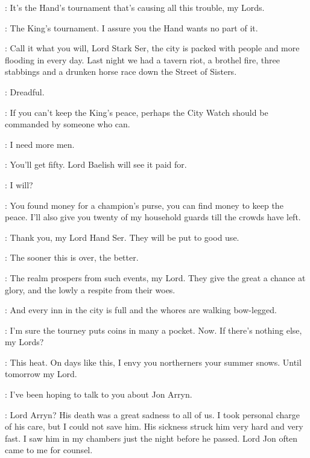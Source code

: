 
\JANOSSLYNT: It's the Hand's tournament that's causing all this trouble, my Lords. 

\NED: The King's tournament. I assure you the Hand wants no part of it. 

\JANOSSLYNT: Call it what you will, Lord Stark Ser, the city is packed with people and more flooding in every day. Last night we had a tavern riot, a brothel fire, three stabbings and a drunken horse race down the Street of Sisters. 

\VARYS: Dreadful. 

\RENLY: If you can't keep the King's peace, perhaps the City Watch should be commanded by someone who can. 

\JANOSSLYNT: I need more men. 

\NED: You'll get fifty. Lord Baelish will see it paid for. 

\LITTLEFINGER: I will? 

\NED: You found money for a champion's purse, you can find money to keep the peace. I'll also give you twenty of my household guards till the crowds have left. 

\JANOSSLYNT: Thank you, my Lord Hand Ser. They will be put to good use. 


\NED: The sooner this is over, the better. 

\VARYS: The realm prospers from such events, my Lord. They give the great a chance at glory, and the lowly a respite from their woes. 

\LITTLEFINGER: And every inn in the city is full and the whores are walking bow-legged. 

\NED: I'm sure the tourney puts coins in many a pocket. Now. If there's nothing else, my Lords? 


\PYCELLE: This heat. On days like this, I envy you northerners your summer snows. Until tomorrow my Lord. 

\NED: I've been hoping to talk to you about Jon Arryn. 

\PYCELLE: Lord Arryn? His death was a great sadness to all of us. I took personal charge of his care, but I could not save him. His sickness struck him very hard and very fast. I saw him in my chambers just the night before he passed. Lord Jon often came to me for counsel. 


